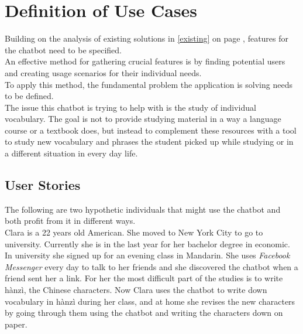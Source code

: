 \section{Definition of Use Cases}


Building on the analysis of existing solutions in \ref{existing} on page \pageref{existing}, features for the chatbot need to be specified.
\\
An effective method for gathering crucial features is by finding potential users
and creating usage scenarios for their individual needs.
\\

To apply this method, the fundamental problem the application is solving needs to be defined.
\\

The issue this chatbot is trying to help with is the study of individual vocabulary.
The goal is not to provide studying material in a way a language course or a textbook does,
but instead to complement these resources with a tool to study new vocabulary and phrases the student picked up
while studying or in a different situation in every day life.
\\


\subsection{User Stories}

The following are two hypothetic individuals that might use the chatbot and both profit from it in different ways.
\\

Clara is a 22 years old American.
She moved to New York City to go to university.
Currently she is in the last year for her bachelor degree in economic.
In university she signed up for an evening class in Mandarin.
She uses \emph{Facebook Messenger} every day to talk to her friends and she discovered the chatbot when a friend sent her a link.
For her the most difficult part of the studies is to write hànzì, the Chinese characters.
Now Clara uses the chatbot to write down vocabulary in hànzì during her class,
and at home she revises the new characters by going through them using the chatbot and writing the characters
down on paper.
\\

